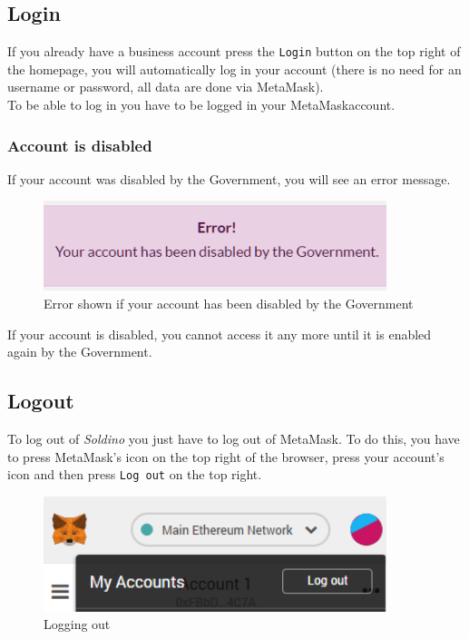 	\subsection{Login}
	If you already have a business account press the \texttt{Login} button on the 
	top right of the homepage, you will automatically log in your account 
	(there is no need for an username or password, all data are done via MetaMask). 
	\\To be able to log in you have to be logged in your MetaMask\glosp account.
		\subsubsection{Account is disabled}
		If your account was disabled by the Government, you will see an error 
		message.
		\begin{figure}[H]
			\includegraphics[width=10cm]{res/images/user_disabled.png}
			\centering
			\caption{Error shown if your account has been disabled by the Government}
		\end{figure}
	\noindent If your account is disabled, you cannot access it any more until it 
	is enabled again by the Government.
	\subsection{Logout}
	To log out of \textit{Soldino} you just have to log out of 
	MetaMask\glo{}. To do this, you have to press MetaMask's icon on the top 
	right of the browser, press your account's icon and then press \texttt{Log out}
	on the top right.
	\begin{figure}[H]
		\includegraphics[width=10cm]{res/images/logout_metamask.png}
		\centering
		\caption{Logging out}
	\end{figure}

